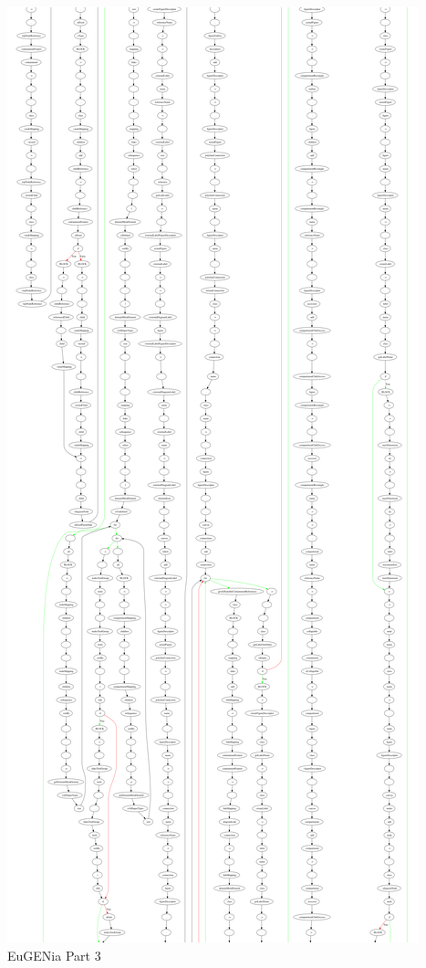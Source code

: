 \begin{minipage}[b]{\textwidth}
\centering
\includegraphics[height=0.97\textheight]{./figures/eug_3.png}
EuGENia Part 3
\end{minipage}
